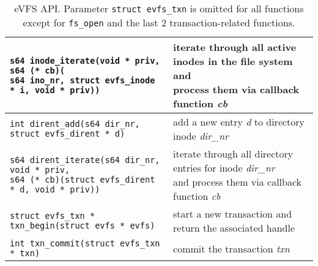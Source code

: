 \begin{table*}
\begin{center}
\begin{small}
\begin{tabular}[t]{|l|l|}
\makecell[l]{\texttt{s64 inode\_iterate(void * priv, s64 (* cb)(} \\ 
\hspace{1em}\texttt{s64 ino\_nr, struct evfs\_inode * i, void * priv))}} & \makecell[l]{iterate through all active inodes in the file system and \\ process them via callback function \textit{cb}} \\
\hline
\hline
\texttt{int dirent\_add(s64 dir\_nr, struct evfs\_dirent * d)} & add a new entry \textit{d} to directory inode \textit{dir\_nr} \\
\hline 
\makecell[l]{\texttt{s64 dirent\_iterate(s64 dir\_nr, void * priv,} \\ 
\hspace{1em}\texttt{s64 (* cb)(struct evfs\_dirent * d, void * priv))}} & \makecell[l]{iterate through all directory entries for inode \textit{dir\_nr} \\ and process them via callback function \textit{cb}} \\
\hline
\hline
\texttt{struct evfs\_txn * txn\_begin(struct evfs * evfs)} & start a new transaction and return the associated handle \\
\hline 
\texttt{int txn\_commit(struct evfs\_txn * txn)} & commit the transaction \textit{txn} \\
\hline 
\end{tabular}
\end{small}
\end{center}
\vspace{-15pt}
\caption{\label{tab:evfs-api}eVFS API. Parameter \texttt{struct evfs\_txn} is omitted for all functions except for \texttt{fs\_open} and the last 2 transaction-related functions.}
\vspace{-6pt}
\end{table*}

